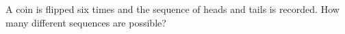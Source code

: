 A coin is flipped six times and the sequence of heads and tails is recorded. How many different sequences are possible?
